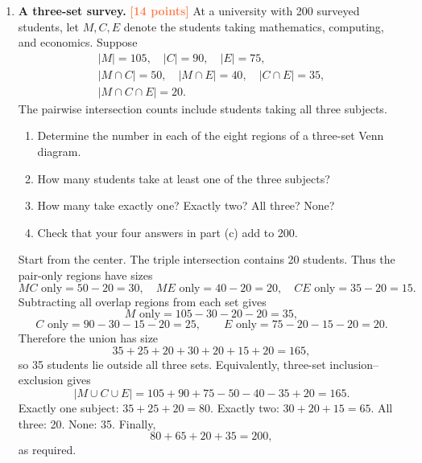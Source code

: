 \documentclass[11pt]{article}
\newcommand{\points}[1]{\hfill\textcolor{coral}{\small\bfseries[#1 points]}}
\begin{document}
\begin{enumerate}[resume]
\item \textbf{A three-set survey.} \points{14}
At a university with 200 surveyed students, let $M,C,E$ denote the students
taking mathematics, computing, and economics. Suppose
\[
\begin{gathered}
|M|=105,\quad |C|=90,\quad |E|=75,\\
|M\cap C|=50,\quad |M\cap E|=40,\quad |C\cap E|=35,\\
|M\cap C\cap E|=20.
\end{gathered}
\]
The pairwise intersection counts include students taking all three subjects.
\begin{enumerate}
  \item Determine the number in each of the eight regions of a three-set Venn diagram.
  \item How many students take at least one of the three subjects?
  \item How many take exactly one? Exactly two? All three? None?
  \item Check that your four answers in part (c) add to 200.
\end{enumerate}
\begin{solution}
Start from the center. The triple intersection contains 20 students. Thus
the pair-only regions have sizes
\[
  MC\text{ only}=50-20=30,\quad
  ME\text{ only}=40-20=20,\quad
  CE\text{ only}=35-20=15.
\]
Subtracting all overlap regions from each set gives
\[
  M\text{ only}=105-30-20-20=35,
\]
\[
  C\text{ only}=90-30-15-20=25,
  \qquad E\text{ only}=75-20-15-20=20.
\]
Therefore the union has size
\[
  35+25+20+30+20+15+20=165,
\]
so 35 students lie outside all three sets. Equivalently, three-set
inclusion--exclusion gives
\[
|M\cup C\cup E|=105+90+75-50-40-35+20=165.
\]
Exactly one subject: $35+25+20=80$. Exactly two: $30+20+15=65$.
All three: 20. None: 35. Finally,
\[
  80+65+20+35=200,
\]
as required.
\end{solution}


\end{enumerate}
\end{document}
